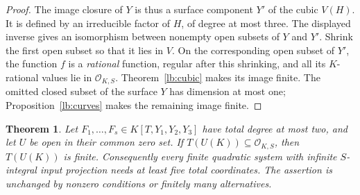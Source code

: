 \documentclass[11pt,a4paper]{article}
\newtheorem{theorem}{Theorem}[section]
\theoremstyle{definition}
\newcommand{\OKS}{\mathcal O_{K,S}}
\begin{document}
\begin{proof}
The image closure of $Y$ is thus a surface component $Y'$ of
the cubic $V(H)$. It is defined by an irreducible factor of
$H$, of degree at most three. The displayed inverse gives an
isomorphism between nonempty open subsets of $Y$ and $Y'$.
Shrink the first open subset so that it lies in $V$. On the
corresponding open subset of $Y'$, the function $f$ is a
\emph{rational} function, regular after this shrinking, and
all its $K$-rational values lie in $\OKS$.
Theorem~\ref{lb:cubic} makes its image finite. The omitted
closed subset of the surface $Y$ has dimension at most one;
Proposition~\ref{lb:curves} makes the remaining image finite.
\end{proof}

\begin{theorem}\label{lb:quadratic-five}
Let $F_1,\ldots,F_s\in K[T,Y_1,Y_2,Y_3]$ have total degree
at most two, and let $U$ be open in their common zero set.
If $T(U(K))\subseteq\OKS$, then $T(U(K))$ is finite.
Consequently every finite quadratic system with infinite
$S$-integral input projection needs at least five total coordinates.
The assertion is unchanged by nonzero conditions or finitely many
alternatives.
\end{theorem}
\end{document}
